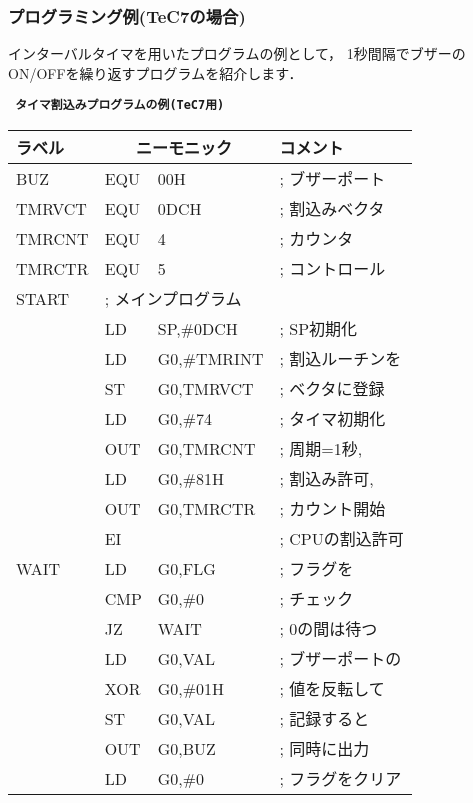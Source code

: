 \subsubsection{プログラミング例(TeC7の場合)}

インターバルタイマを用いたプログラムの例として，
1秒間隔でブザーのON/OFFを繰り返すプログラムを紹介します．

\begin{center}
{\small\tt
{\bf タイマ割込みプログラムの例(TeC7用)}
\begin{tabular}{|l|l l l|} \hline
ラベル & \multicolumn{2}{|c}{ニーモニック} & コメント      \\
\hline
BUZ   & EQU   & 00H               & ; ブザーポート   \\
TMRVCT& EQU   & 0DCH              & ; 割込みベクタ   \\
TMRCNT& EQU   & 4                 & ; カウンタ       \\
TMRCTR& EQU   & 5                 & ; コントロール   \\
START & \multicolumn{3}{|l|}{; メインプログラム}     \\
      & LD    & SP,\#0DCH         & ; SP初期化       \\
      & LD    & G0,\#TMRINT       & ; 割込ルーチンを \\
      & ST    & G0,TMRVCT         & ;   ベクタに登録 \\
      & LD    & G0,\#74           & ; タイマ初期化   \\
      & OUT   & G0,TMRCNT         & ;   周期=1秒,    \\
      & LD    & G0,\#81H          & ;   割込み許可,  \\
      & OUT   & G0,TMRCTR	  & ;   カウント開始 \\
      & EI    &                   & ; CPUの割込許可  \\
WAIT  & LD    & G0,FLG            & ; フラグを       \\
      & CMP   & G0,\#0            & ;   チェック     \\
      & JZ    & WAIT              & ; 0の間は待つ    \\
      & LD    & G0,VAL            & ; ブザーポートの \\
      & XOR   & G0,\#01H          & ;   値を反転して \\
      & ST    & G0,VAL            & ;   記録すると   \\
      & OUT   & G0,BUZ            & ;   同時に出力   \\
      & LD    & G0,\#0            & ; フラグをクリア \\

\end{tabular}}
\end{center}
